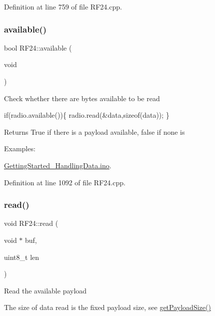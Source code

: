 Definition at line 759 of file R\+F24.\+cpp.

\mbox{\label{classRF24_a127105eb7a3b351cfe777c1cec50627a}} 
\subsubsection{\texorpdfstring{available()}{available()}\hspace{0.1cm}{\footnotesize\ttfamily [1/2]}}
{\footnotesize\ttfamily bool R\+F24\+::available (\begin{DoxyParamCaption}\item[{void}]{ }\end{DoxyParamCaption})}

Check whether there are bytes available to be read 
\begin{DoxyCode}
\textcolor{keywordflow}{if}(radio.available())\{
  radio.read(&data,\textcolor{keyword}{sizeof}(data));
\}
\end{DoxyCode}
 \begin{DoxyReturn}{Returns}
True if there is a payload available, false if none is 
\end{DoxyReturn}
\begin{Desc}
\item[Examples\+: ]\par
\hyperlink{GettingStarted_HandlingData_8ino-example}{Getting\+Started\+\_\+\+Handling\+Data.\+ino}.\end{Desc}


Definition at line 1092 of file R\+F24.\+cpp.

\mbox{\label{classRF24_a8e2eacacfba96426c192066f04054c5b}} 
\subsubsection{\texorpdfstring{read()}{read()}}
{\footnotesize\ttfamily void R\+F24\+::read (\begin{DoxyParamCaption}\item[{void $\ast$}]{buf,  }\item[{uint8\+\_\+t}]{len }\end{DoxyParamCaption})}

Read the available payload

The size of data read is the fixed payload size, see \hyperlink{classRF24_a0aa0c7cbe3d38fef4722f3f1d2d6c5f1}{get\+Payload\+Size()}

